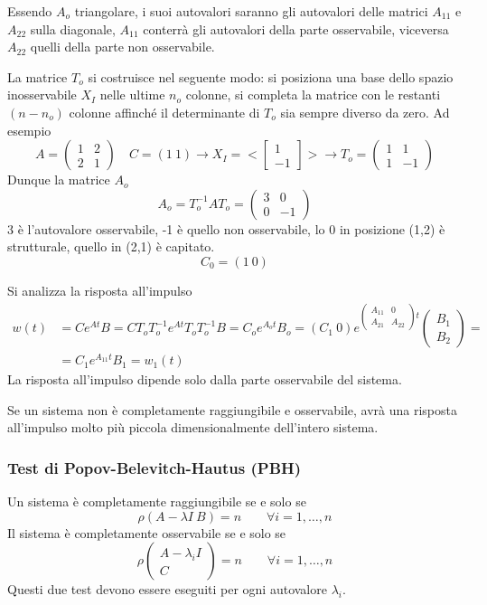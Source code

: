 Essendo $A_o$ triangolare, i suoi autovalori saranno gli autovalori delle
matrici $A_{11}$ e $A_{22}$ sulla diagonale, $A_{11}$ conterrà gli autovalori
della parte osservabile, viceversa $A_{22}$ quelli della parte non osservabile.

La matrice $T_o$ si costruisce nel seguente modo: si posiziona una base dello
spazio inosservabile $X_I$ nelle ultime $n_o$ colonne, si completa la matrice
con le restanti $(n-n_o)$ colonne affinché il determinante di $T_o$ sia sempre
diverso da zero.
Ad esempio
$$
A= \begin{pmatrix}
1 & 2 \\ 2 & 1
\end{pmatrix}\quad
C = (1\ 1)\rightarrow
X_I = <\begin{bmatrix}
1 \\ -1
\end{bmatrix}>
\rightarrow
T_o = \begin{pmatrix}
1 & 1 \\
1 & -1
\end{pmatrix}
$$
Dunque la matrice $A_o$
$$
A_o = T_o^{-1} A T_o = \begin{pmatrix}
3 & 0 \\
0 & -1
\end{pmatrix}
$$
3 è l'autovalore osservabile, -1 è quello non osservabile, lo 0 in posizione
(1,2) è strutturale, quello in (2,1) è capitato.
$$
C_0 = (1\ 0)
$$

\newpage
Si analizza la risposta all'impulso
$$\begin{aligned}
w(t) &= Ce^{At}B = CT_oT_o^{-1}e^{At} T_oT_o^{-1}B = C_o e^{A_ot}B_o = (C_1\ 0)
e^{\begin{pmatrix}
A_{11} & 0 \\
A_{21} & A_{22}
\end{pmatrix}t
}\begin{pmatrix}
B_1 \\ B_2
\end{pmatrix} = \\
&=C_1 e ^{A_{11}t}B_1 = w_1(t)
\end{aligned}
$$
La risposta all'impulso dipende solo dalla parte osservabile del sistema.

Se un sistema non è completamente raggiungibile e osservabile, avrà una
risposta all'impulso molto più piccola dimensionalmente dell'intero sistema.

\subsubsection{Test di Popov-Belevitch-Hautus (PBH)}
Un sistema è completamente raggiungibile se e solo se
$$
\rho(A-\lambda I \ B) = n\qquad \forall i = 1,\dots, n
$$
Il sistema è completamente osservabile se e solo se
$$
\rho \begin{pmatrix}
A-\lambda_i I \\
C
\end{pmatrix} = n \qquad\forall i =1,\dots,n
$$
Questi due test devono essere eseguiti per ogni autovalore $\lambda_i$.
